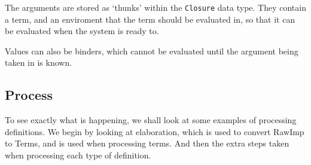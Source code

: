 \documentclass[a4paper]{article}
\begin{document}
The arguments are stored as `thunks' within the \texttt{Closure} data type.  
They contain a term, and an enviroment that the term should be evaluated 
in, so that it can be evaluated when the system is ready to. 

Values can also be binders, which cannot be evaluated until the argument
being taken in is known. 

\subsection{Process}
\label{sec:orgecfa1fe}
To see exactly what is happening, we shall look at some examples of 
processing definitions. We begin by looking at elaboration, which is 
used to convert RawImp to Terms, and is used when processing terms. 
And then the extra steps taken when processing each type of definition. 
\end{document}
